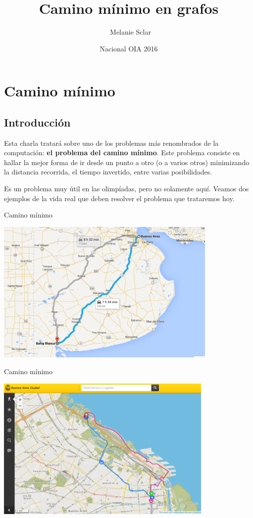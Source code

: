 \documentclass[compress]{beamer}
\title[Camino mínimo en grafos] %
{Camino mínimo en grafos}
\author[Melanie Sclar] %
{~Melanie Sclar}
\institute[UBA] %
{
  Facultad de Ciencias Exactas y Naturales\\
  Universidad de Buenos Aires
}
\date[Nacional OIA 2016] %
{Nacional OIA 2016}
\begin{document}
\begin{frame}
  \titlepage
\end{frame}

\section{Camino mínimo}
\subsection{Introducción}
\begin{frame}
Esta charla tratará sobre uno de los problemas más renombrados de la
computación: \textbf{el problema del camino mínimo}. Este problema 
consiste en hallar la mejor forma de ir desde un punto a otro (o a varios
otros) minimizando la distancia recorrida, el tiempo invertido, entre
varias posibilidades.

\bigskip
\bigskip

Es un problema muy útil en las olimpíadas, pero no solamente aquí.
Veamos dos ejemplos de la vida real que deben resolver el problema que
trataremos hoy.
\end{frame}


\begin{frame}{Camino m\'inimo}
\begin{center}
\includegraphics[height=7cm]{google-maps.png} \\
\end{center}
\end{frame}

\begin{frame}{Camino m\'inimo}
\begin{center}
\includegraphics[height=7cm]{mapa-buenos-aires.png} \\
\end{center}
\end{frame}
\end{document}

